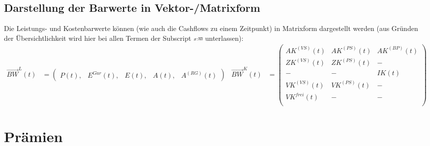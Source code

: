 \documentclass[a4paper,10pt]{article}
\makeatletter
\DeclareRobustCommand{\act}[2][]{%
\def\arraystretch{0}%
\setlength\arraycolsep{0.5pt}%
\setlength\arrayrulewidth{0.5pt}%
\setbox0=\hbox{$\scriptstyle#1\ifx#1\empty{asdf}\else:\fi#2$}%
\begin{array}[b]{*2{@{}>{\scriptstyle}c}|}
\cline{2-2}%
\rule[1.25pt]{0pt}{\ht0}%
#1\ifx#1\empty\else:\fi & #2%
\end{array}%
}
\makeatother
\begin{document}
\subsection{Darstellung der Barwerte in Vektor-/Matrixform}
Die Leistungs- und Kostenbarwerte können (wie auch die Cashflows zu einem Zeitpunkt) 
in Matrixform dargestellt werden (aus Gründen der Übersichtlichkeit wird hier bei 
allen Termen der Subscript ${\act[x]{n}}$ unterlassen):
\begin{align*}
  \overrightarrow{BW}^L(t) &= \left(
 \begin{matrix}
    P(t), & E^{Gar}(t), & E(t), & A(t), & A^{(RG)}(t)
 \end{matrix}
 \right)
% 
 &
%  
 \overrightarrow{BW}^K(t) &= \left(
 \begin{matrix}
AK^{(VS)}(t) & AK^{(PS)}(t)  & AK^{(BP)}(t) \\
% 
ZK^{(VS)}(t) & ZK^{(PS)}(t)  & -\\
% 
- & - & IK(t) \\
% 
VK^{(VS)}(t) & VK^{(PS)}(t) & -\\
VK^{frei}(t) & - & -\\  
 \end{matrix}
 \right)
% 
\end{align*}



\pagebreak

\section{Prämien}
\end{document}
